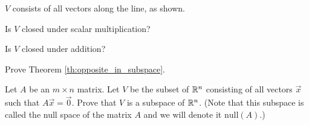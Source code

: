 \documentclass{ximera}
\begin{document}
\begin{problem} \label{prob:closedmultchoice2}
$V$ consists of all vectors along the line, as shown.

 
 Is $V$ closed under scalar multiplication?
 
 \begin{multipleChoice}
 \end{multipleChoice}
 
 Is $V$ closed under addition?
 
 \begin{multipleChoice}
 \end{multipleChoice}
\end{problem}    


\begin{problem}\label{prob:opposite_in_subspace}
Prove Theorem \ref{th:opposite_in_subspace}.
\end{problem}

\begin{problem}\label{prob:null(A)_is_subspace}
Let $A$ be an $m \times n$ matrix.  Let $V$ be the subset of $\mathbb{R}^n$ consisting of all vectors $\vec{x}$ such that $A \vec{x} = \vec{0}$.  Prove that $V$ is a subspace of $\mathbb{R}^n$.  (Note that this subspace is called the null space of the matrix $A$ and we will denote it $\mbox{null}(A)$.)
\end{problem}
\end{document}
